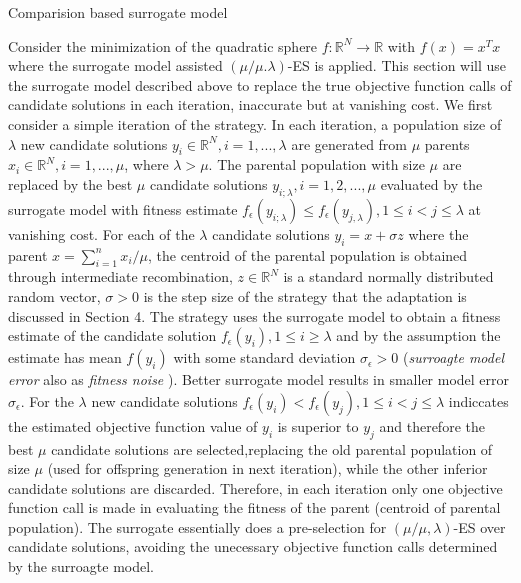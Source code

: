 Comparision based surrogate model 

Consider the minimization of the quadratic sphere $f: \mathbb R^N \rightarrow \mathbb R$ with $f(x)=x^Tx$ where the surrogate model assisted $(\mu/\mu.\lambda)$-ES is applied. This section will use the surrogate model described above to replace the true objective function calls of candidate solutions in each iteration, inaccurate but at vanishing cost. We first consider a simple iteration of the strategy. In each iteration, a population size of $\lambda$ new candidate solutions $y_i \in \mathbb{R}^N,i = 1,...,\lambda $ are generated from $\mu$ parents $x_i \in \mathbb{R}^N, i=1,...,\mu$, where $\lambda>\mu$. The parental population with size $\mu$ are replaced by the best $\mu$ candidate solutions $y_{i;\lambda},i = 1,2,...,\mu$ evaluated by the surrogate model with fitness estimate $f_{\epsilon}(y_{i;\lambda}) \leq f_{\epsilon}(y_{j,\lambda}), 1 \leq i < j \leq \lambda$ at vanishing cost. For each of the $\lambda$ candidate solutions $y_i=x + \sigma z$ where the parent $x = \sum_{i=1}^n x_i/\mu$, the centroid of the parental population is obtained through intermediate recombination, $z \in  \mathbb R^N$ is a standard normally distributed random vector, $\sigma > 0$ is the step size of the strategy that the adaptation is discussed in Section 4. The strategy uses the surrogate model to obtain a fitness estimate of the candidate solution $f_{\epsilon} (y_i), 1 \leq i \geq \lambda$ and by the assumption the estimate has mean $f(y_i)$ with some standard deviation $\sigma_\epsilon > 0$ (\textit{surroagte model error} also as \textit{fitness noise} \cite{1284729}). Better surrogate model results in smaller model error $\sigma_\epsilon$. For the $\lambda$ new candidate solutions $f_\epsilon (y_i) < f_\epsilon (y_j), 1 \leq i < j \leq \lambda$ indiccates the estimated objective function value of $y_i$ is superior to $y_j$ and therefore the best $\mu$ candidate solutions are selected,replacing the old parental population of size $\mu$ (used for offspring generation in next iteration), while the other inferior candidate solutions are discarded. Therefore, in each iteration only one objective function call is made in evaluating the fitness of the parent (centroid of parental population). The surrogate essentially does a pre-selection for $(\mu/\mu,\lambda)$-ES over candidate solutions, avoiding the unecessary objective function calls determined by the surroagte model.  


